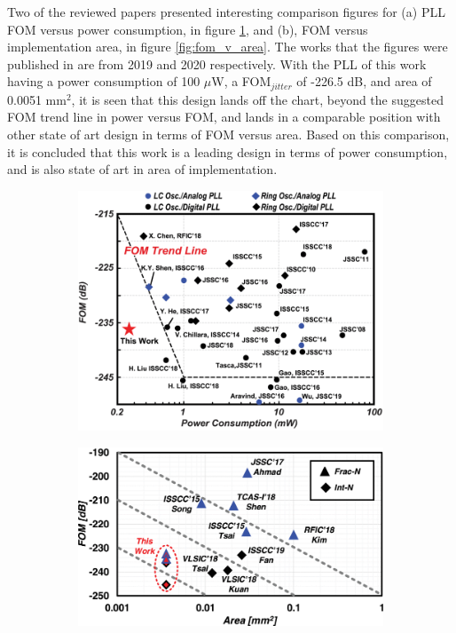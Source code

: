 Two of the reviewed papers presented interesting comparison figures for (a) PLL FOM versus power consumption, in figure \ref{fig:fom_v_pow}, and (b), FOM versus implementation area, in figure \ref{fig:fom_v_area}. The works that the figures were published in are from 2019 and 2020 respectively. With the PLL of this work having a power consumption of 100 $\mu$W, a FOM$_{jitter}$ of -226.5 dB, and area of 0.0051 mm$^2$, it is seen that this design lands off the chart, beyond the suggested FOM trend line in power versus FOM, and lands in a comparable position with other state of art design in terms of FOM versus area. Based on this comparison, it is concluded that this work is a leading design in terms of power consumption, and is also state of art in area of implementation.


	\begin{figure}[htb!]
	    \centering
	    \begin{subfigure}{0.5\textwidth}
	        \centering
	        \includegraphics[width=1\textwidth, angle=0]{./figs/liu24-fom}
	        \caption{ }
	        \label{fig:fom_v_pow}
	    \end{subfigure}%
	    \begin{subfigure}{0.5\textwidth}
	        \centering
	        \includegraphics[width=1\textwidth, angle=0]{./figs/liu_5nm}

\end{subfigure}
\end{figure}
